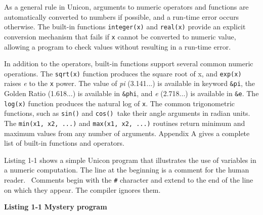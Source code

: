 As a general rule in Unicon, arguments to numeric operators and
functions are automatically converted to numbers if possible, and a run-time error occurs otherwise. The built-in functions
\texttt{integer(x)} and
\texttt{real(x)} provide an explicit conversion
mechanism that fails if \texttt{x} cannot be converted to numeric
value, allowing a program to check values without resulting in a
run-time error.

In addition to the operators, built-in functions support several common
numeric operations. The
\texttt{sqrt(x)} function produces the square root of x,
and \texttt{exp(x)} raises \textit{e} to the \texttt{x}
power. The value of \textit{pi} (3.141...) is
available in keyword \texttt{\&pi}, the Golden Ratio (1.618...) is available in \texttt{\&phi}, and \textit{e} (2.718...) is available in
\texttt{\&e}. The \texttt{log(x)}
function produces the natural log of
\texttt{x}. The common trigonometric
functions, such as \texttt{sin()} and
\texttt{cos()}\texttt{ }take their angle arguments in
radian units. The \texttt{min(x1, x2, ...)}
and \texttt{max(x1, x2, ...)} routines return minimum and
maximum values from any number of arguments. Appendix A gives a
complete list of built-in functions and operators.

Listing 1-1 shows a simple Unicon program that illustrates the use of
variables in a numeric computation. The line at the beginning is a
comment for the human reader. \ Comments begin with the
\texttt{\#} character and extend to the end of the line on which they
appear. The compiler ignores them.

\bigskip

{\sffamily\bfseries Listing 1-1}
{\sffamily\bfseries Mystery program}


